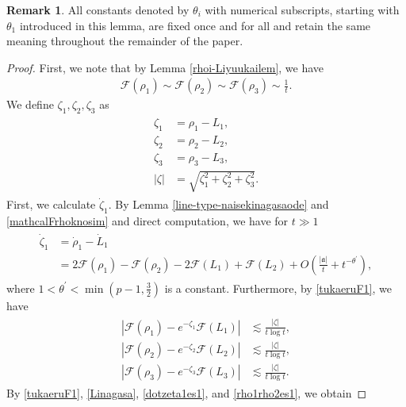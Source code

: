 \documentclass[reqno]{amsart}
\theoremstyle{plain}
\theoremstyle{definition}
\newtheorem{remark}{Remark}[section]
\numberwithin{equation}{section}
\begin{document}
\begin{remark}
All constants denoted by $\theta_i$ with numerical subscripts, starting with $\theta_1$ introduced in this lemma, are fixed once and for all and retain the same meaning throughout the remainder of the paper.
\end{remark}



\begin{proof}
First, we note that by Lemma \ref{rhoi-Liyuukailem}, we have
\begin{align}\label{mathcalFrhoknosim}
\mathcal{F}(\rho_1)\sim \mathcal{F}(\rho_2)\sim \mathcal{F}(\rho_3)\sim \frac{1}{t}.
\end{align}
We define $\zeta_1,\zeta_2,\zeta_3$ as 
\begin{align}\label{zetaidef}
\begin{aligned}
\zeta_1&=\rho_1-L_1,
\\
\zeta_2&=\rho_2-L_2,
\\
\zeta_3&=\rho_3-L_3,
\\
|\zeta|&=\sqrt{\zeta_1^2+\zeta_2^2+\zeta_3^2}.
\end{aligned}
\end{align}
First, we calculate $\dot{\zeta}_1$. By Lemma \ref{line-type-naisekinagasaode} and \eqref{mathcalFrhoknosim} and direct computation, we have for $t\gg 1$
\begin{align}\label{dotzeta1es1}
\begin{aligned}
\dot{\zeta}_1&=\dot{\rho}_1-\dot{L}_1
\\
&=2\mathcal{F}(\rho_1)-\mathcal{F}(\rho_2)-2\mathcal{F}(L_1)+\mathcal{F}(L_2)+O\left(\frac{|\mathfrak{a}|}{t}+t^{-\theta^{\prime}}\right),
\end{aligned}
\end{align}
where $1<\theta^{\prime}<\min{(p-1,\frac{3}{2})}$ is a constant. Furthermore, by \eqref{tukaeruF1}, we have
\begin{align}\label{rho1rho2es1}
\begin{aligned}
\left|\mathcal{F}(\rho_1)-e^{-\zeta_1}\mathcal{F}(L_1)\right|&\lesssim \frac{|\zeta|}{t\log{t}},
\\
\left|\mathcal{F}(\rho_2)-e^{-\zeta_2}\mathcal{F}(L_2)\right|&\lesssim \frac{|\zeta|}{t\log{t}},
\\
\left|\mathcal{F}(\rho_3)-e^{-\zeta_3}\mathcal{F}(L_3)\right|&\lesssim \frac{|\zeta|}{t\log{t}}.
\end{aligned}
\end{align}
By \eqref{tukaeruF1}, \eqref{Linagasa}, \eqref{dotzeta1es1}, and \eqref{rho1rho2es1}, we obtain

\end{proof}
\end{document}
